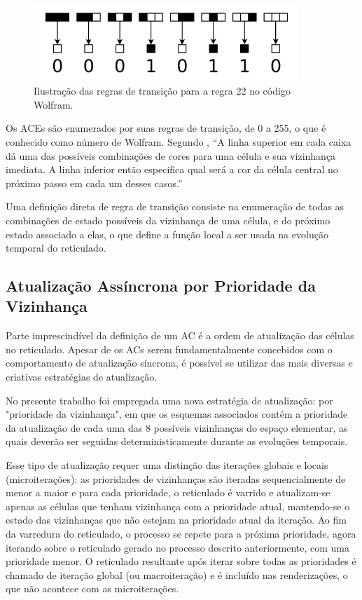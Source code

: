\documentclass[a4paper,12pt]{ltxdoc}
\newcommand\tab[1][1cm]{\hspace*{#1}}
\begin{document}
\begin{figure}[!htbp]
  \centerline{\includegraphics[width=10cm]{imgs/rule_22.png}}
  \caption{Ilustração das regras de transição para a regra 22 no código Wolfram. }
\end{figure}

\tab Os ACEs são enumerados por suas regras de transição, de 0 a 255, o que é conhecido como número de Wolfram. Segundo \cite[p. 24]{wolfram2002new}, ``A linha superior em cada caixa dá uma das possíveis combinações de cores para uma célula e sua vizinhança imediata. A linha inferior então especifica qual será a cor da célula central no próximo passo em cada um desses casos.''

\tab Uma definição direta de regra de transição consiste na enumeração de todas as combinações de estado possíveis da vizinhança de uma célula, e do próximo estado associado a elas, o que define a função local a ser usada na evolução temporal do reticulado.


\subsection{Atualização Assíncrona por Prioridade da Vizinhança} \label{udsn}
Parte imprescindível da definição de um AC é a ordem de atualização das células no reticulado. Apesar de os ACs serem fundamentalmente concebidos com o comportamento de atualização síncrona, é possível se utilizar das mais diversas e criativas estratégias de atualização.

\tab No presente trabalho foi empregada uma nova estratégia de atualização: por "prioridade da vizinhança", em que os esquemas associados contém a prioridade da atualização de cada uma das 8 possíveis vizinhanças do espaço elementar, as quais deverão ser seguidas deterministicamente durante as evoluções temporais.  

\tab Esse tipo de atualização requer uma distinção das iterações globais e locais (microiterações):  as prioridades de vizinhanças são iteradas sequencialmente de menor a maior e para cada prioridade, o reticulado é varrido e atualizam-se apenas as células que tenham vizinhança com a prioridade atual, mantendo-se o estado das vizinhanças que não estejam na prioridade atual da iteração. Ao fim da varredura do reticulado, o processo se repete para a próxima prioridade, agora iterando sobre o reticulado gerado no processo descrito anteriormente, com uma prioridade menor. O reticulado resultante após iterar sobre todas as prioridades é chamado de iteração global (ou macroiteração) e é incluído nas renderizações, o que não acontece com as microiterações.
\end{document}
